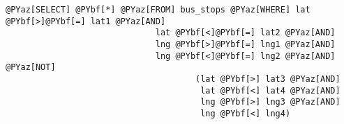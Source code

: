 \begin{Verbatim}[commandchars=@\[\]]
@PYaz[SELECT] @PYbf[*] @PYaz[FROM] bus_stops @PYaz[WHERE] lat @PYbf[>]@PYbf[=] lat1 @PYaz[AND]
                              lat @PYbf[<]@PYbf[=] lat2 @PYaz[AND]
                              lng @PYbf[>]@PYbf[=] lng1 @PYaz[AND]
                              lng @PYbf[<]@PYbf[=] lng2 @PYaz[AND] @PYaz[NOT]
                                      (lat @PYbf[>] lat3 @PYaz[AND]
                                       lat @PYbf[<] lat4 @PYaz[AND]
                                       lng @PYbf[>] lng3 @PYaz[AND]
                                       lng @PYbf[<] lng4)
\end{Verbatim}
